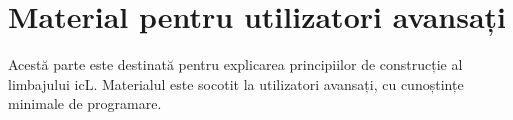 \part{Material pentru utilizatori avansați}

Acestă parte este destinată pentru explicarea principiilor de construcție al limbajului icL. Materialul este socotit la utilizatori avansați, cu cunoștințe minimale de programare.
